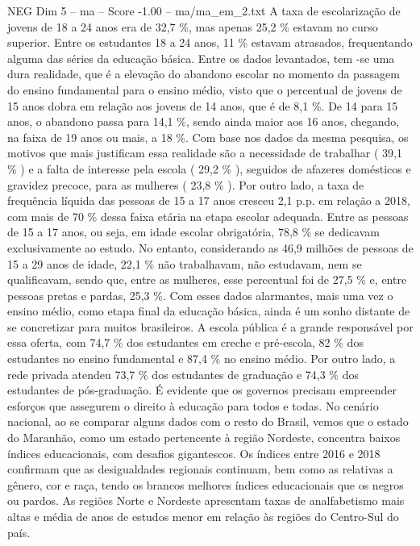 \begin{textsample}{NEG Dim 5 – ma – Score -1.00 – ma/ma\_em\_2.txt}
A taxa de escolarização de jovens de 18 a 24 anos era de 32,7 \%, mas apenas 25,2 \% estavam no curso superior.
Entre os estudantes 18 a 24 anos, 11 \% estavam atrasados, frequentando alguma das séries da educação básica.
Entre os dados levantados, tem -se uma dura realidade, que é a elevação do abandono escolar no momento da passagem do ensino fundamental para o ensino médio, visto que o percentual de jovens de 15 anos dobra em relação aos jovens de 14 anos, que é de 8,1 \%.
De 14 para 15 anos, o abandono passa para 14,1 \%, sendo ainda maior aos 16 anos, chegando, na faixa de 19 anos ou mais, a 18 \%.
Com base nos dados da mesma pesquisa, os motivos que mais justificam essa realidade são a necessidade de trabalhar ( 39,1 \% ) e a falta de interesse pela escola ( 29,2 \% ), seguidos de afazeres domésticos e gravidez precoce, para as mulheres ( 23,8 \% ).
Por outro lado, a taxa de frequência líquida das pessoas de 15 a 17 anos cresceu 2,1 p.p. em relação a 2018, com mais de 70 \% dessa faixa etária na etapa escolar adequada.
Entre as pessoas de 15 a 17 anos, ou seja, em idade escolar obrigatória, 78,8 \% se dedicavam exclusivamente ao estudo.
No entanto, considerando as 46,9 milhões de pessoas de 15 a 29 anos de idade, 22,1 \% não trabalhavam, não estudavam, nem se qualificavam, sendo que, entre as mulheres, esse percentual foi de 27,5 \% e, entre pessoas pretas e pardas, 25,3 \%.
Com esses dados alarmantes, mais uma vez o ensino médio, como etapa final da educação básica, ainda é um sonho distante de se concretizar para muitos brasileiros.
A escola pública é a grande responsável por essa oferta, com 74,7 \% dos estudantes em creche e pré-escola, 82 \% dos estudantes no ensino fundamental e 87,4 \% no ensino médio.
Por outro lado, a rede privada atendeu 73,7 \% dos estudantes de graduação e 74,3 \% dos estudantes de pós-graduação.
É evidente que os governos precisam empreender esforços que assegurem o direito à educação para todos e todas.
No cenário nacional, ao se comparar alguns dados com o resto do Brasil, vemos que o estado do Maranhão, como um estado pertencente à região Nordeste, concentra baixos índices educacionais, com desafios gigantescos.
Os índices entre 2016 e 2018 confirmam que as desigualdades regionais continuam, bem como as relativas a gênero, cor e raça, tendo os brancos melhores índices educacionais que os negros ou pardos.
As regiões Norte e Nordeste apresentam taxas de analfabetismo mais altas e média de anos de estudos menor em relação às regiões do Centro-Sul do país.

\end{textsample}
